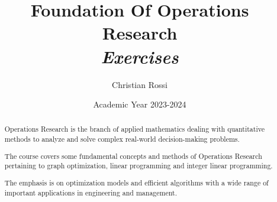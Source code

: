 \documentclass[12pt, a4paper]{report}
\title{Foundation Of Operations Research \\ \textit{Exercises}}
\author{Christian Rossi}
\date{Academic Year 2023-2024}
\newtheorem[style=M,bodystyle=\normalfont]{theorem}{Theorem}
\newtheorem[style=M,bodystyle=\normalfont]{corollary}{Corollary}
\newtheorem[style=M,bodystyle=\normalfont]{lemma}{Lemma}
\newtheorem[style=M,bodystyle=\normalfont]{definition}{Definition}
\begin{document}
\maketitle

\newpage

\begin{abstract}
    Operations Research is the branch of applied mathematics dealing with quantitative methods to analyze and solve
    complex real-world decision-making problems. 
    
    The course covers some fundamental concepts and methods of Operations Research pertaining to graph optimization, 
    linear programming and integer linear programming. 
    
    The emphasis is on optimization models and efficient algorithms with a wide range of important applications in 
    engineering and management.  
\end{abstract}

\newpage

\tableofcontents

\newpage
\end{document}
